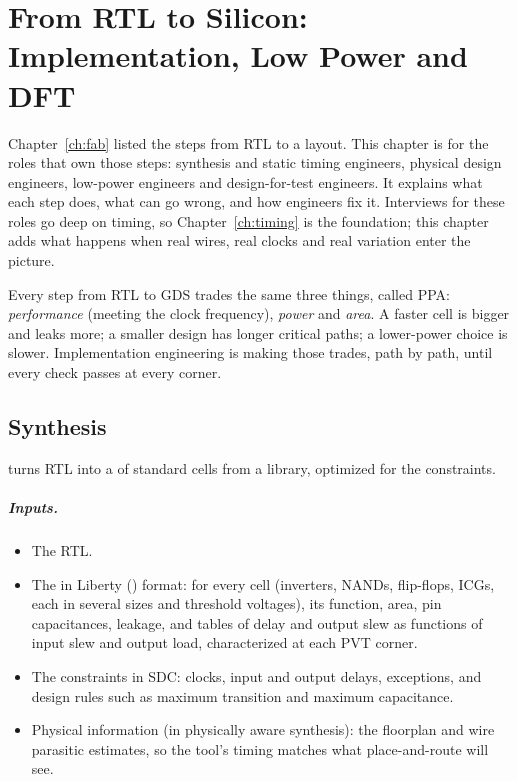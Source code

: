 \chapter{From RTL to Silicon: Implementation, Low Power and DFT}
\label{ch:impl}

Chapter~\ref{ch:fab} listed the steps from RTL to a layout. This chapter is for the roles that own those steps: synthesis and static timing engineers, physical design engineers, low-power engineers and design-for-test engineers. It explains what each step does, what can go wrong, and how engineers fix it. Interviews for these roles go deep on timing, so Chapter~\ref{ch:timing} is the foundation; this chapter adds what happens when real wires, real clocks and real variation enter the picture.

\begin{bigidea}
Every step from RTL to GDS trades the same three things, called PPA: \emph{performance} (meeting the clock frequency), \emph{power} and \emph{area}. A faster cell is bigger and leaks more; a smaller design has longer critical paths; a lower-power choice is slower. Implementation engineering is making those trades, path by path, until every check passes at every corner.
\end{bigidea}

\section{Synthesis}

 turns RTL into a  of standard cells from a library, optimized for the constraints.

\paragraph{Inputs.}
\begin{itemize}
  \item The RTL.
  \item The  in Liberty () format: for every cell (inverters, NANDs, flip-flops, ICGs, each in several sizes and threshold voltages), its function, area, pin capacitances, leakage, and tables of delay and output slew as functions of input slew and output load, characterized at each PVT corner.
  \item The constraints in SDC: clocks, input and output delays, exceptions, and design rules such as maximum transition and maximum capacitance.
  \item Physical information (in physically aware synthesis): the floorplan and wire parasitic estimates, so the tool's timing matches what place-and-route will see.
\end{itemize}

